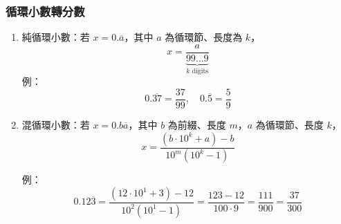 \subsubsection{循環小數轉分數}
\begin{enumerate}\itemsep = -3pt
\item 純循環小數：若 $x = 0.\overline{a}$，其中 $a$ 為循環節、長度為 $k$，
\[
x = \frac{a}{\underbrace{99\ldots9}_{k \text{ digits}}}
\]
例：
\[
0.\overline{37} = \frac{37}{99}, \quad 0.\overline{5} = \frac{5}{9}
\]

\item 混循環小數：若 $x = 0.b\overline{a}$，其中 $b$ 為前綴、長度 $m$，$a$ 為循環節、長度 $k$，
\[
x = \frac{(b \cdot 10^k + a) - b}{10^m(10^k-1)}
\]

例：
\[
0.12\overline{3} 
= \frac{(12 \cdot 10^1 + 3) - 12}{10^2(10^1-1)}
= \frac{123 - 12}{100 \cdot 9}
= \frac{111}{900}
= \frac{37}{300}
\]
\end{enumerate}

